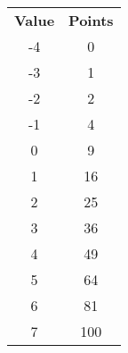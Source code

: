 \begin{table}[h!]
    \begin{tabular}{c c}
        \bfseries{Value} & \bfseries{Points} \\
        -4 & 0 \\
        -3 & 1 \\
        -2 & 2 \\
        -1 & 4 \\
        0 & 9 \\
        1 & 16 \\
        2 & 25 \\
        3 & 36 \\
        4 & 49 \\
        5 & 64 \\
        6 & 81 \\
        7 & 100 \\
    \end{tabular}
    \label{tab:point-buy}
\end{table}
